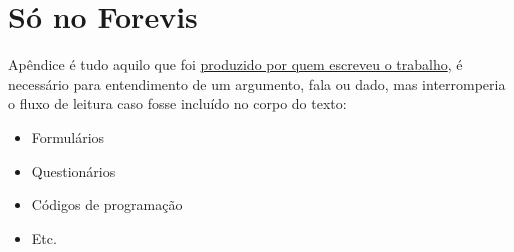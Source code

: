 \chapter{Só no Forevis}
Apêndice é tudo aquilo que foi \underline{produzido por quem escreveu o trabalho}, é necessário para entendimento de um argumento, fala ou dado, mas interromperia o fluxo de leitura caso fosse incluído no corpo do texto:  

\begin{itemize}
    \item Formulários 
    \item Questionários 
    \item Códigos de programação 
    \item Etc.
\end{itemize}